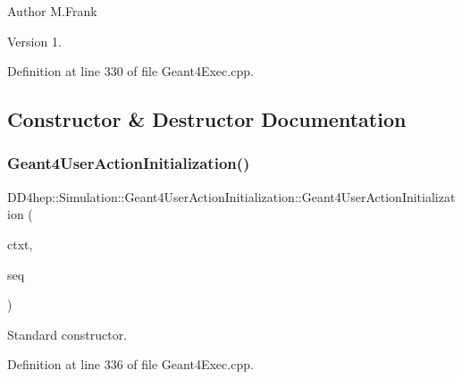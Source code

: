 \begin{DoxyAuthor}{Author}
M.\+Frank 
\end{DoxyAuthor}
\begin{DoxyVersion}{Version}
1. 
\end{DoxyVersion}


Definition at line 330 of file Geant4\+Exec.\+cpp.



\subsection{Constructor \& Destructor Documentation}
\hypertarget{class_d_d4hep_1_1_simulation_1_1_geant4_user_action_initialization_ad5dad70e283015614959f397022c506a}{}\label{class_d_d4hep_1_1_simulation_1_1_geant4_user_action_initialization_ad5dad70e283015614959f397022c506a} 
\subsubsection{\texorpdfstring{Geant4\+User\+Action\+Initialization()}{Geant4UserActionInitialization()}}
{\footnotesize\ttfamily D\+D4hep\+::\+Simulation\+::\+Geant4\+User\+Action\+Initialization\+::\+Geant4\+User\+Action\+Initialization (\begin{DoxyParamCaption}\item[{\hyperlink{class_d_d4hep_1_1_simulation_1_1_geant4_context}{Geant4\+Context} $\ast$}]{ctxt,  }\item[{\hyperlink{class_d_d4hep_1_1_simulation_1_1_geant4_user_initialization_sequence}{Geant4\+User\+Initialization\+Sequence} $\ast$}]{seq }\end{DoxyParamCaption})\hspace{0.3cm}{\ttfamily [inline]}}



Standard constructor. 



Definition at line 336 of file Geant4\+Exec.\+cpp.

\hypertarget{class_d_d4hep_1_1_simulation_1_1_geant4_user_action_initialization_a576b51911e71f7979dd327d8a76b1738}{}\label{class_d_d4hep_1_1_simulation_1_1_geant4_user_action_initialization_a576b51911e71f7979dd327d8a76b1738} 
